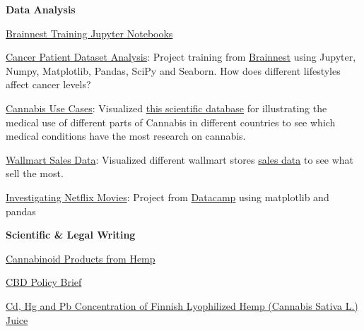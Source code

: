 \documentclass[a4paper,11pt]{article}
\begin{document}
\textbf{Data Analysis} %
\begin{innerlist}

\item \href{https://github.com/Saltiola7/brainnest}{Brainnest Training Jupyter Notebooks}

\item \href{https://github.com/Saltiola7/brainnest}{Cancer Patient Dataset Analysis}: Project training from \href{https://brainnest.consulting/}{Brainnest} using Jupyter, Numpy, Matplotlib, Pandas, SciPy and Seaborn. How does different lifestyles affect cancer levels?

\item \href{https://public.tableau.com/views/UseofdifferentpartsofCannabisfordifferentmedicalusesindifferentcountries/DifferentPlantPartsMedUseCatCountries?:language=en-US&:display_count=n&:origin=viz_share_link}{Cannabis Use Cases}: Visualized \href{https://academic.oup.com/database/article/doi/10.1093/database/baab024/6261425}{this scientific database} for illustrating the medical use of different parts of Cannabis in different countries to see which medical conditions have the most research on cannabis.

\item \href{https://public.tableau.com/app/profile/saltiola7/viz/WallmartSalesAnalysis_16593931691930/Story1}{Wallmart Sales Data}: Visualized different wallmart stores  \href{https://www.kaggle.com/c/m5-forecasting-accuracy}{sales data} to see what sell the most.
\item \href{https://github.com/Saltiola7/Investigating-Netflix-Movies-and-Guest-Stars-in-The-Office}{Investigating Netflix Movies}: Project from \href{https://www.datacamp.com/}{Datacamp} using matplotlib and pandas

\end{innerlist}

\textbf{Scientific \& Legal Writing}
\begin{innerlist}
\item \href{https://figshare.com/articles/thesis/Hampun_kannabinoidituotteet_pdf/19077536}{Cannabinoid Products from Hemp}
\item \href{https://figshare.com/articles/book/Policy_brief_CBD_ja_hampunviljely_Suomessa/19097018}{CBD Policy Brief}
\item \href{https://doi.org/10.22541/au.159916070.07390723}{Cd, Hg and Pb Concentration of Finnish Lyophilized Hemp (Cannabis Sativa L.)  Juice}
\end{innerlist}
\end{document}
